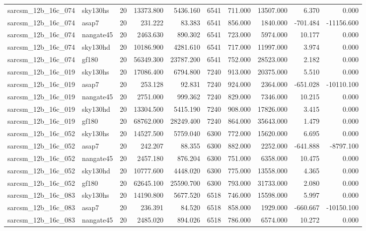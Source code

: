 \begin{tabular}{llrrrrrrrr}
sarcsm\_12b\_16c\_074 & sky130hs & 20 & 13373.800 & 5436.160 & 6541 & 711.000 & 13507.000 & 6.370 & 0.000 \\
sarcsm\_12b\_16c\_074 & asap7 & 20 & 231.222 & 83.383 & 6541 & 856.000 & 1840.000 & -701.484 & -11156.600 \\
sarcsm\_12b\_16c\_074 & nangate45 & 20 & 2463.630 & 890.302 & 6541 & 723.000 & 5974.000 & 10.177 & 0.000 \\
sarcsm\_12b\_16c\_074 & sky130hd & 20 & 10186.900 & 4281.610 & 6541 & 717.000 & 11997.000 & 3.974 & 0.000 \\
sarcsm\_12b\_16c\_074 & gf180 & 20 & 56349.300 & 23787.200 & 6541 & 752.000 & 28523.000 & 2.182 & 0.000 \\
sarcsm\_12b\_16c\_019 & sky130hs & 20 & 17086.400 & 6794.800 & 7240 & 913.000 & 20375.000 & 5.510 & 0.000 \\
sarcsm\_12b\_16c\_019 & asap7 & 20 & 253.128 & 92.831 & 7240 & 924.000 & 2364.000 & -651.028 & -10110.100 \\
sarcsm\_12b\_16c\_019 & nangate45 & 20 & 2751.000 & 999.362 & 7240 & 829.000 & 7346.000 & 10.215 & 0.000 \\
sarcsm\_12b\_16c\_019 & sky130hd & 20 & 13304.500 & 5415.190 & 7240 & 908.000 & 17826.000 & 3.415 & 0.000 \\
sarcsm\_12b\_16c\_019 & gf180 & 20 & 68762.000 & 28249.400 & 7240 & 864.000 & 35643.000 & 1.479 & 0.000 \\
sarcsm\_12b\_16c\_052 & sky130hs & 20 & 14527.500 & 5759.040 & 6300 & 772.000 & 15620.000 & 6.695 & 0.000 \\
sarcsm\_12b\_16c\_052 & asap7 & 20 & 242.207 & 88.355 & 6300 & 882.000 & 2252.000 & -641.888 & -8797.100 \\
sarcsm\_12b\_16c\_052 & nangate45 & 20 & 2457.180 & 876.204 & 6300 & 751.000 & 6358.000 & 10.475 & 0.000 \\
sarcsm\_12b\_16c\_052 & sky130hd & 20 & 10777.600 & 4448.020 & 6300 & 775.000 & 13558.000 & 4.365 & 0.000 \\
sarcsm\_12b\_16c\_052 & gf180 & 20 & 62645.100 & 25590.700 & 6300 & 793.000 & 31733.000 & 2.080 & 0.000 \\
sarcsm\_12b\_16c\_083 & sky130hs & 20 & 14190.800 & 5677.520 & 6518 & 746.000 & 15598.000 & 5.997 & 0.000 \\
sarcsm\_12b\_16c\_083 & asap7 & 20 & 236.391 & 84.520 & 6518 & 858.000 & 1929.000 & -660.667 & -10150.100 \\
sarcsm\_12b\_16c\_083 & nangate45 & 20 & 2485.020 & 894.026 & 6518 & 786.000 & 6574.000 & 10.272 & 0.000 \\

\end{tabular}
